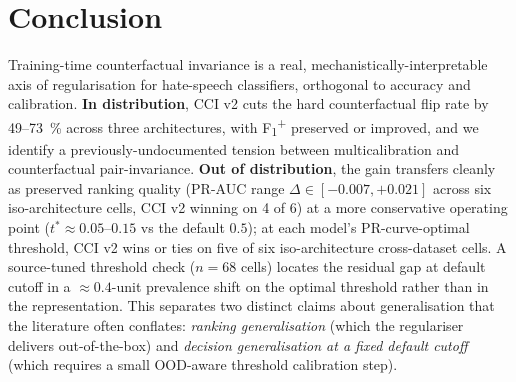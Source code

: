 \documentclass[10pt,a4paper]{article}
\begin{document}
\section{Conclusion}

Training-time counterfactual invariance is a real,
mechanistically-interpretable axis of regularisation for hate-speech
classifiers, orthogonal to accuracy and calibration.
\textbf{In distribution}, CCI v2 cuts the hard counterfactual flip rate
by 49--73~\% across three architectures, with
F\textsubscript{1}\textsuperscript{+} preserved or improved, and we
identify a previously-undocumented tension between multicalibration and
counterfactual pair-invariance.
\textbf{Out of distribution}, the gain transfers cleanly as preserved
ranking quality (PR-AUC range $\Delta \in [-0.007, +0.021]$ across six
iso-architecture cells, CCI v2 winning on 4 of 6) at a more conservative operating point
($t^*\!\approx\!0.05$--$0.15$ vs the default $0.5$); at each model's
PR-curve-optimal threshold, CCI v2 wins or ties on five of six
iso-architecture cross-dataset cells. A source-tuned threshold check
($n{=}68$ cells) locates the residual gap at default cutoff in a
$\approx 0.4$-unit prevalence shift on the optimal threshold rather
than in the representation. This separates two distinct claims about
generalisation that the literature often conflates:
\emph{ranking generalisation} (which the regulariser delivers
out-of-the-box) and \emph{decision generalisation at a fixed default
cutoff} (which requires a small OOD-aware threshold calibration step).

\small


\end{document}
